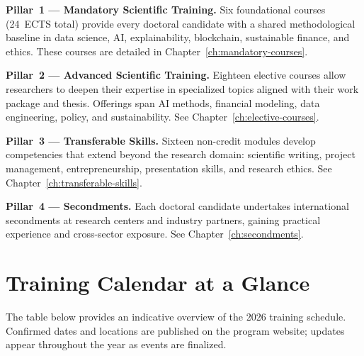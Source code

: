 \vspace{6pt}

\textbf{Pillar~1 --- Mandatory Scientific Training.}\quad
Six foundational courses (24~ECTS total) provide every doctoral candidate with
a shared methodological baseline in data science, AI, explainability,
blockchain, sustainable finance, and ethics.  These courses are detailed in
Chapter~\ref{ch:mandatory-courses}.

\textbf{Pillar~2 --- Advanced Scientific Training.}\quad
Eighteen elective courses allow researchers to deepen their expertise in
specialized topics aligned with their work package and thesis.  Offerings span
AI methods, financial modeling, data engineering, policy, and sustainability.
See Chapter~\ref{ch:elective-courses}.

\textbf{Pillar~3 --- Transferable Skills.}\quad
Sixteen non-credit modules develop competencies that extend beyond the research
domain: scientific writing, project management, entrepreneurship, presentation
skills, and research ethics.  See Chapter~\ref{ch:transferable-skills}.

\textbf{Pillar~4 --- Secondments.}\quad
Each doctoral candidate undertakes international secondments at research centers
and industry partners, gaining practical experience and cross-sector exposure.
See Chapter~\ref{ch:secondments}.

\section{Training Calendar at a Glance}
\label{sec:training-calendar}

The table below provides an indicative overview of the 2026 training schedule.
Confirmed dates and locations are published on the program website; updates
appear throughout the year as events are finalized.

\vspace{4pt}


